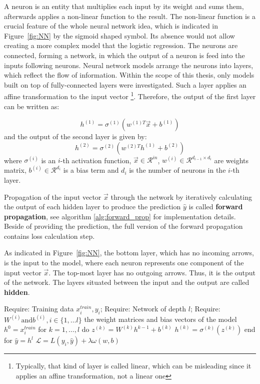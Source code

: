  A neuron is an entity that multiplies each input by its weight and sums them, afterwards applies a non-linear function to the result. The non-linear function is a crucial feature of the whole neural network idea, which is indicated in Figure~\ref{fig:NN} by the sigmoid shaped symbol. Its absence would not allow creating a more complex model that the logistic regression.  The neurons are connected, forming a network, in which the output of a neuron is feed into the inputs following neurons. Neural network models arrange the neurons into layers, which reflect the flow of information. Within the scope of this thesis, only models built on top of fully-connected layers were investigated. Such a layer applies an affine transformation to the input vector \footnote{Typically, that kind of layer is called linear, which can be misleading since it applies an affine transformation, not a linear one}. Therefore, the output of the first layer can be written as: 

\begin{equation}
h^{(1)} = \sigma^{(1)}(w^{(1)T}\vec{x}+b^{(1)})
\end{equation}
and the output of the  second layer is given by: 
\begin{equation}
h^{(2)} = \sigma^{(2)}(w^{(2)T}h^{(1)}+b^{(2)})
\end{equation}
where $  \sigma^{(i)}$ is an $i$-th activation function, $\vec{x} \in \mathcal{R}^{in}$, $w^{(i)} \in \mathcal{R}^{d_{i-1}\times d_{i}}$ are weights matrix, $b^{(i)} \in \mathcal{R}^{d_{i}}$ is a bias term and $d_{i}$ is the number of neurons in the $i$-th layer.  

Propagation of the input vector $\vec{x}$ through the network by iteratively calculating the output of each hidden layer to produce the prediction $\hat{y}$ is called \textbf{forward propagation}, see algorithm \ref{alg:forward_prop} for implementation details. Beside of providing the prediction, the full version of the forward propagation contains loss calculation step.  

As indicated in Figure~\ref{fig:NN}, the bottom layer, which has no incoming arrows, is the input to the model, where each neuron represents one component of the input vector $\vec{x}$. 
 The top-most layer has no outgoing arrows. Thus, it is the output of the network.  The layers situated between the input and the output are called \textbf{hidden}. 

\begin{algorithm}[caption={Forward propagation of feed-forward neural network }, label={alg:forward_prop}]
Require: Training data ${x^{train}_{i} , y_{i}}$;
Require: Network of depth $l$;
Require: $W^{(i)} \textrm{and}  b^{(i)}, i \in \{ 1, \ldots l \}$ the weight matrices and bias vectors of the model
$h^{0} =x^{train}_{i}$ 
for $k = 1, \ldots, l$ do
   $z^{(k)} = W^{(k)}h^{k-1} +b^{(k)}$ 
   $h^{(k)} = \sigma^{(k)}(z^{(k)})$
end for
$\hat{y} = h^{l}$
$\mathcal{L} = L(y_{i}, \hat{y}) + \lambda \omega(w, b)$
\end{algorithm}

